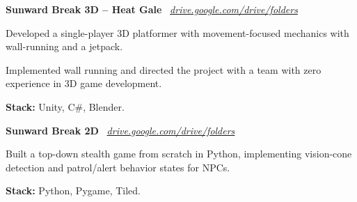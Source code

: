\begin{onecolentry}
\textbf{Sunward Break 3D – Heat Gale} \
\textit{\href{https://drive.google.com/drive/folders/1qxCw2BFty3NAGFAy8rxgdD7cgBjDTLI4?usp=sharing}{drive.google.com/drive/folders}}

\end{onecolentry}

\vspace{0.20 cm}
\begin{onecolentry}
\begin{highlights}
\item Developed a single-player 3D platformer with movement-focused mechanics with wall-running and a jetpack.
\item Implemented wall running and directed the project with a team with zero experience in 3D game development.
\item \textbf{Stack:} Unity, C\#, Blender.
\end{highlights}
\end{onecolentry}

\vspace{0.2 cm}

\begin{onecolentry}
\textbf{Sunward Break 2D} \
\textit{\href{https://drive.google.com/drive/folders/1sLz1S1gJQGhMduDUw5MLdOKH04oDLoP2?usp=sharing}{drive.google.com/drive/folders}}

\end{onecolentry}

\vspace{0.20 cm}
\begin{onecolentry}
\begin{highlights}
\item Built a top-down stealth game from scratch in Python, implementing vision-cone detection and patrol/alert behavior states for NPCs.
\item \textbf{Stack:} Python, Pygame, Tiled.
\end{highlights}
\end{onecolentry}

